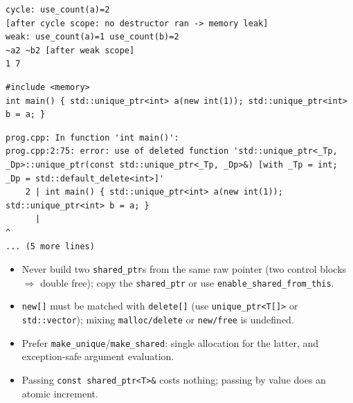 \documentclass[10pt,a4paper,openany,oneside]{report}
\begin{document}
\begin{lstlisting}[style=out,title={Answer: captured output}]
cycle: use_count(a)=2
[after cycle scope: no destructor ran -> memory leak]
weak: use_count(a)=1 use_count(b)=2
~a2 ~b2 [after weak scope]
1 7
\end{lstlisting}
\begin{lstlisting}[language={[11]C++},title={Copying a unique\_ptr does not compile (by design)}]
#include <memory>
int main() { std::unique_ptr<int> a(new int(1)); std::unique_ptr<int> b = a; }
\end{lstlisting}
\begin{lstlisting}[style=out]
prog.cpp: In function 'int main()':
prog.cpp:2:75: error: use of deleted function 'std::unique_ptr<_Tp, _Dp>::unique_ptr(const std::unique_ptr<_Tp, _Dp>&) [with _Tp = int; _Dp = std::default_delete<int>]'
    2 | int main() { std::unique_ptr<int> a(new int(1)); std::unique_ptr<int> b = a; }
      |                                                                           ^
... (5 more lines)
\end{lstlisting}

\begin{trapbox}
\begin{itemize}[nosep]
\item Never build two \texttt{shared\_ptr}s from the same raw pointer (two control blocks $\Rightarrow$ double free); copy the \texttt{shared\_ptr} or use \texttt{enable\_shared\_from\_this}.
\item \texttt{new[]} must be matched with \texttt{delete[]} (use \texttt{unique\_ptr<T[]>} or \texttt{std::vector}); mixing \texttt{malloc/delete} or \texttt{new/free} is undefined.
\item Prefer \texttt{make\_unique}/\texttt{make\_shared}: single allocation for the latter, and exception-safe argument evaluation.
\item Passing \texttt{const shared\_ptr<T>\&} costs nothing; passing by value does an atomic increment.
\end{itemize}
\end{trapbox}


\end{document}
